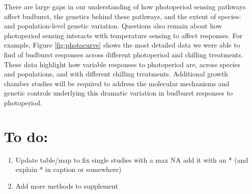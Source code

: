 \documentclass{article}
\begin{document}
\par There are large gaps in our understanding of how photoperiod sensing pathways affect budburst, the genetics behind these pathways, and the extent of species- and population-level genetic variation. Questions also remain about how photoperiod sensing interacts with temperature sensing to affect responses. For example, Figure \ref{fig:photocurve} shows the most detailed data we were able to find of budburst responses across different photoperiod and chilling treatments. These data highlight how variable responses to photoperiod are, across species and populations, and with different chilling treatments. Additional growth chamber studies will be required to address the molecular mechanisms and genetic controls underlying this dramatic variation in  budburst responses to photoperiod. 

\section* {To do:}
\begin{enumerate}
\item Update table/map to fix single studies with a max NA add it with an * (and explain * in caption or somewhere)
\item Add more methods to supplement
\end{enumerate}


\clearpage
\end{document}
